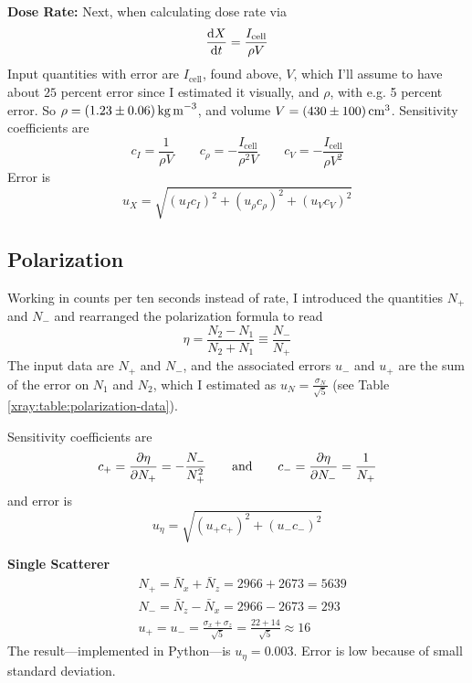 \documentclass[11pt, a4paper]{article}
\newcommand{\eqtext}[1]{\qquad \text{#1} \qquad}
\begin{document}
\textbf{Dose Rate:} Next, when calculating dose rate via
\begin{equation*}
	\dv{X}{t} = \frac{I_{\text{cell}}}{\rho V}
\end{equation*}
Input quantities with error are $ I_{\text{cell}} $, found above, $ V $, which I'll assume to have about $ 25 $ percent error since I estimated it visually, and $ \rho $, with e.g. 5 percent error. So $ \rho = \SI{1.23 \pm 0.06}{\kilogram \, \meter^{-3}} $, and volume $ V = \SI{430 \pm 100}{\centi \meter^{3}} $. Sensitivity coefficients are
\begin{equation*}
	c_{I} = \frac{1}{\rho V} \qquad c_{\rho} = -\frac{I_{\text{cell}}}{\rho^{2} V} \qquad c_{V} = -\frac{I_{\text{cell}}}{\rho V^{2}}
\end{equation*}
Error is 
\begin{equation*}
	u_{X} = \sqrt{(u_{I}c_{I})^{2} + (u_{\rho}c_{\rho})^{2} + (u_{V}c_{V})^{2}}
\end{equation*}

\subsection{Polarization}
Working in counts per ten seconds instead of rate, I introduced the quantities $ N_{+} $ and $ N_{-} $ and rearranged the polarization formula to read
\begin{equation*}
	\eta = \frac{N_{2} - N_{1}}{N_{2} + N_{1}} \equiv \frac{N_{-}}{N_{+}}
\end{equation*}
The input data are $ N_{+} $ and $ N_{-} $, and the associated errors $ u_{-} $ and $ u_{+} $ are the sum of the error on $ N_{1} $ and $ N_{2} $, which I estimated as $ u_{N} = \frac{\sigma_{N}}{\sqrt{5}} $ (see Table \ref{xray:table:polarization-data}). 



Sensitivity coefficients are
\begin{equation*}
	c_{+} = \pdv{\eta}{N_{+}} = - \frac{N_{-}}{N_{+}^{2}} \eqtext{and} c_{-} = \pdv{\eta}{N_{-}} = \frac{1}{N_{+}}
\end{equation*}
and error is
\begin{equation*}
	u_{\eta} = \sqrt{(u_{+}c_{+})^{2} + (u_{-}c_{-})^{2}}
\end{equation*}

\textbf{Single Scatterer}
\begin{align*}
	& N_{+} = \bar{N}_{x} + \bar{N}_{z} = 2966 + 2673 = 5639  \\ 
	& N_{-} = \bar{N}_{z} - \bar{N}_{x} = 2966 - 2673 = 293  \\ 
	& u_{+} = u_{-} = \frac{\sigma_{x} + \sigma_{z}}{\sqrt{5}} = \frac{22 + 14}{\sqrt{5}} \approx 16
\end{align*}
The result---implemented in Python---is $ u_{\eta} = 0.003 $. Error is low because of small standard deviation.
\end{document}

